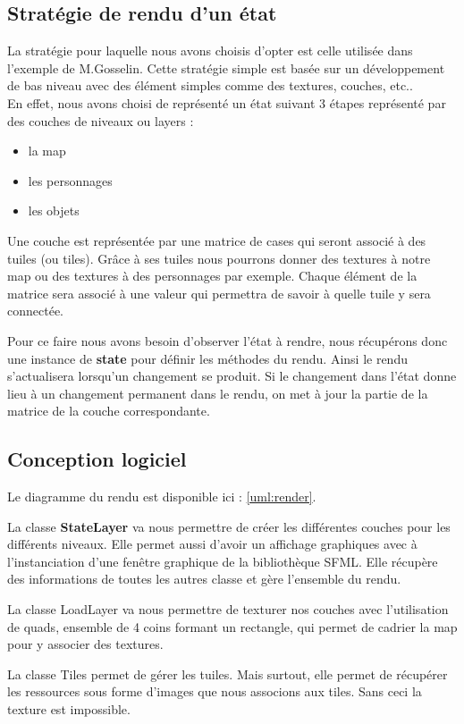 \documentclass[a4paper,12pt]{article}
\begin{document}
\subsection{Stratégie de rendu d'un état}
La stratégie pour laquelle nous avons choisis d'opter est celle utilisée dans l'exemple de M.Gosselin. Cette stratégie simple est basée sur un développement de bas niveau avec des élément simples comme des textures, couches, etc..\\
En effet, nous avons choisi de représenté un état suivant 3 étapes représenté par des couches de niveaux ou layers :\\
\begin{itemize}
\item la map 
\item les personnages
\item les objets\\
\end{itemize}
\par 
Une couche est représentée par une matrice de cases qui seront associé à des tuiles (ou tiles). Grâce à ses tuiles nous pourrons donner des textures à notre map ou des textures à des personnages par exemple. Chaque élément de la matrice sera associé à une valeur qui permettra de savoir à quelle tuile y sera connectée. \\
\par
Pour ce faire nous avons besoin d’observer l’état à rendre, nous récupérons donc une instance de \textbf{state} pour définir les méthodes du rendu. Ainsi le rendu s'actualisera lorsqu’un changement se produit. Si le changement dans l’état donne lieu à un changement permanent dans le rendu, on met à jour la partie de la matrice de la couche correspondante.\\


\subsection{Conception logiciel}
Le diagramme du rendu est disponible ici : \ref{uml:render}.\\
\par
La classe \textbf{StateLayer} va nous permettre de créer les différentes couches pour les différents niveaux. Elle permet aussi d'avoir un affichage graphiques avec à l'instanciation d'une fenêtre graphique de la bibliothèque SFML. Elle récupère des informations de toutes les autres classe et gère l'ensemble du rendu.\\
\par
La classe LoadLayer va nous permettre de texturer nos couches avec l'utilisation de quads, ensemble de 4 coins formant un rectangle, qui permet de cadrier la map pour y associer des textures.\\
\par
La classe Tiles permet de gérer les tuiles. Mais surtout, elle permet de récupérer les ressources sous forme d'images que nous associons aux tiles. Sans ceci la texture est impossible.\\
\end{document}
